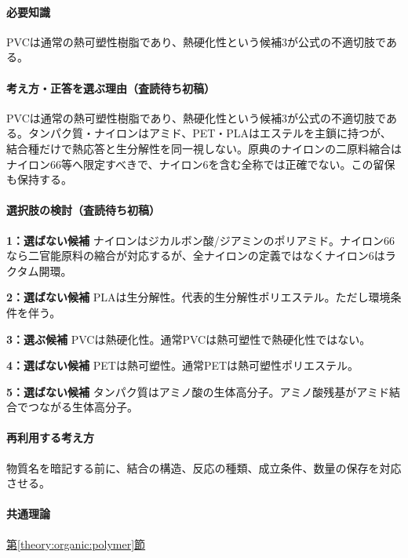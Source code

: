 \paragraph{必要知識} PVCは通常の熱可塑性樹脂であり、熱硬化性という候補3が公式の不適切肢である。

\paragraph{考え方・正答を選ぶ理由（査読待ち初稿）} PVCは通常の熱可塑性樹脂であり、熱硬化性という候補3が公式の不適切肢である。タンパク質・ナイロンはアミド、PET・PLAはエステルを主鎖に持つが、結合種だけで熱応答と生分解性を同一視しない。原典のナイロンの二原料縮合はナイロン66等へ限定すべきで、ナイロン6を含む全称では正確でない。この留保も保持する。

\paragraph{選択肢の検討（査読待ち初稿）}\mbox{}\par

\noindent\textbf{1：選ばない候補} ナイロンはジカルボン酸/ジアミンのポリアミド。ナイロン66なら二官能原料の縮合が対応するが、全ナイロンの定義ではなくナイロン6はラクタム開環。\par

\noindent\textbf{2：選ばない候補} PLAは生分解性。代表的生分解性ポリエステル。ただし環境条件を伴う。\par

\noindent\textbf{3：選ぶ候補} PVCは熱硬化性。通常PVCは熱可塑性で熱硬化性ではない。\par

\noindent\textbf{4：選ばない候補} PETは熱可塑性。通常PETは熱可塑性ポリエステル。\par

\noindent\textbf{5：選ばない候補} タンパク質はアミノ酸の生体高分子。アミノ酸残基がアミド結合でつながる生体高分子。\par

\paragraph{再利用する考え方} 物質名を暗記する前に、結合の構造、反応の種類、成立条件、数量の保存を対応させる。

\paragraph{共通理論} \hyperref[theory:organic:polymer]{第\ref*{theory:organic:polymer}節}

